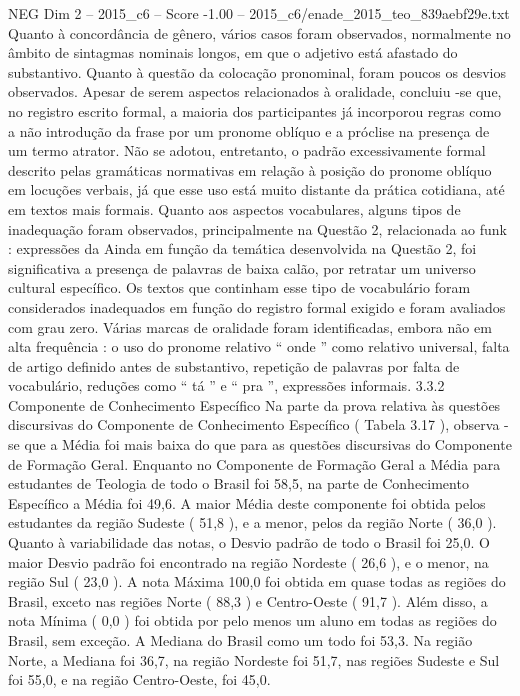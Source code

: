 \begin{textsample}{NEG Dim 2 – 2015\_c6 – Score -1.00 – 2015\_c6/enade\_2015\_teo\_839aebf29e.txt}
Quanto à concordância de gênero, vários casos foram observados, normalmente no âmbito de sintagmas nominais longos, em que o adjetivo está afastado do substantivo.
Quanto à questão da colocação pronominal, foram poucos os desvios observados.
Apesar de serem aspectos relacionados à oralidade, concluiu -se que, no registro escrito formal, a maioria dos participantes já incorporou regras como a não introdução da frase por um pronome oblíquo e a próclise na presença de um termo atrator.
Não se adotou, entretanto, o padrão excessivamente formal descrito pelas gramáticas normativas em relação à posição do pronome oblíquo em locuções verbais, já que esse uso está muito distante da prática cotidiana, até em textos mais formais.
Quanto aos aspectos vocabulares, alguns tipos de inadequação foram observados, principalmente na Questão 2, relacionada ao funk : expressões da Ainda em função da temática desenvolvida na Questão 2, foi significativa a presença de palavras de baixa calão, por retratar um universo cultural específico.
Os textos que continham esse tipo de vocabulário foram considerados inadequados em função do registro formal exigido e foram avaliados com grau zero.
Várias marcas de oralidade foram identificadas, embora não em alta frequência : o uso do pronome relativo “ onde ” como relativo universal, falta de artigo definido antes de substantivo, repetição de palavras por falta de vocabulário, reduções como “ tá ” e “ pra ”, expressões informais. 3.3.2 Componente de Conhecimento Específico Na parte da prova relativa às questões discursivas do Componente de Conhecimento Específico ( Tabela 3.17 ), observa -se que a Média foi mais baixa do que para as questões discursivas do Componente de Formação Geral.
Enquanto no Componente de Formação Geral a Média para estudantes de Teologia de todo o Brasil foi 58,5, na parte de Conhecimento Específico a Média foi 49,6.
A maior Média deste componente foi obtida pelos estudantes da região Sudeste ( 51,8 ), e a menor, pelos da região Norte ( 36,0 ).
Quanto à variabilidade das notas, o Desvio padrão de todo o Brasil foi 25,0.
O maior Desvio padrão foi encontrado na região Nordeste ( 26,6 ), e o menor, na região Sul ( 23,0 ).
A nota Máxima 100,0 foi obtida em quase todas as regiões do Brasil, exceto nas regiões Norte ( 88,3 ) e Centro-Oeste ( 91,7 ).
Além disso, a nota Mínima ( 0,0 ) foi obtida por pelo menos um aluno em todas as regiões do Brasil, sem exceção.
A Mediana do Brasil como um todo foi 53,3.
Na região Norte, a Mediana foi 36,7, na região Nordeste foi 51,7, nas regiões Sudeste e Sul foi 55,0, e na região Centro-Oeste, foi 45,0.

\end{textsample}
